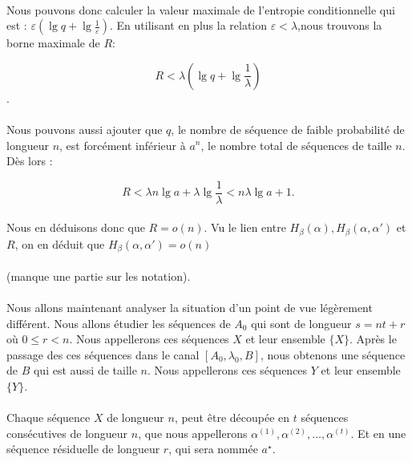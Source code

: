 	\paragraph{}
	Nous pouvons donc calculer la valeur maximale de l'entropie conditionnelle qui est : $\varepsilon \left(\lg q+\lg\frac{1}{\varepsilon}\right)$.
	En utilisant en plus la relation $\varepsilon < \lambda$,nous trouvons la borne maximale de $R$:
	
	\[R<\lambda\left(\lg q+\lg\frac{1}{\lambda}\right)\].
	
	\paragraph{}
	Nous pouvons aussi ajouter que $q$, le nombre de séquence de faible probabilité de longueur $n$, est forcément inférieur à $a^n$, le nombre total de séquences de taille $n$.
	Dès lors :
	
	\[R<\lambda n\lg a +\lambda \lg \frac{1}{\lambda}<n\lambda\lg a+1.\]
	
	\paragraph{}
	Nous en déduisons donc que $R=o(n)$. Vu le lien entre $H_\beta(\alpha),H_\beta(\alpha,\alpha')$ et $R$, on en déduit que $H_\beta(\alpha,\alpha')=o(n)$
	
	\paragraph{}
	(manque une partie sur les notation).
	
	\paragraph{}
	Nous allons maintenant analyser la situation d'un point de vue légèrement différent. Nous allons étudier les séquences de $A_0$ qui sont de longueur $s = nt+r$
	où $0\le r < n$. Nous appellerons ces séquences $X$ et leur ensemble $\{X\}$. Après le passage des ces séquences dans le canal $[A_0,\lambda_0,B]$, nous obtenons
	une séquence de $B$ qui est aussi de taille $n$. Nous appellerons ces séquences $Y$ et leur ensemble $\{Y\}$.
	
	\paragraph{}
	Chaque séquence $X$ de longueur $n$, peut être découpée en $t$ séquences consécutives de longueur $n$, que nous appellerons $\alpha^{(1)}, \alpha^{(2)}, \dots, \alpha^{(t)}$.
	Et en une séquence résiduelle de longueur $r$, qui sera nommée $a^\star$.
	
